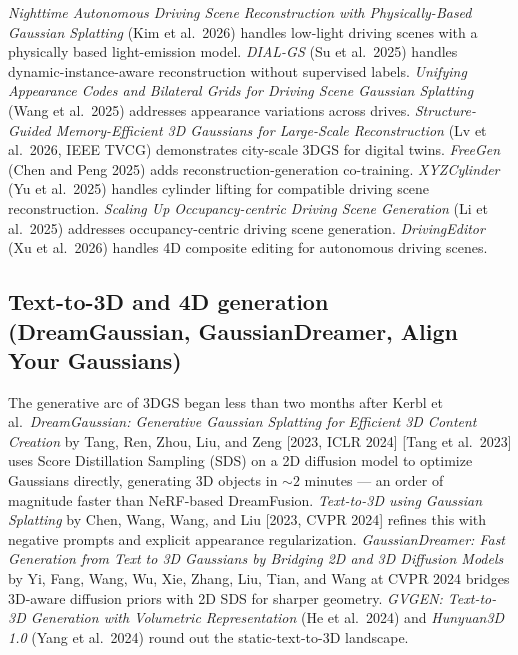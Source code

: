 \documentclass{article}
\begin{document}
\emph{Nighttime Autonomous Driving Scene Reconstruction with Physically-Based Gaussian Splatting} (Kim et al.~2026) handles low-light driving scenes with a physically based light-emission model. \emph{DIAL-GS} (Su et al.~2025) handles dynamic-instance-aware reconstruction without supervised labels. \emph{Unifying Appearance Codes and Bilateral Grids for Driving Scene Gaussian Splatting} (Wang et al.~2025) addresses appearance variations across drives. \emph{Structure-Guided Memory-Efficient 3D Gaussians for Large-Scale Reconstruction} (Lv et al.~2026, IEEE TVCG) demonstrates city-scale 3DGS for digital twins. \emph{FreeGen} (Chen and Peng 2025) adds reconstruction-generation co-training. \emph{XYZCylinder} (Yu et al.~2025) handles cylinder lifting for compatible driving scene reconstruction. \emph{Scaling Up Occupancy-centric Driving Scene Generation} (Li et al.~2025) addresses occupancy-centric driving scene generation. \emph{DrivingEditor} (Xu et al.~2026) handles 4D composite editing for autonomous driving scenes.

\subsection{Text-to-3D and 4D generation (DreamGaussian, GaussianDreamer, Align Your Gaussians)}\label{text-to-3d-and-4d-generation-dreamgaussian-gaussiandreamer-align-your-gaussians}

The generative arc of 3DGS began less than two months after Kerbl et al.~\emph{DreamGaussian: Generative Gaussian Splatting for Efficient 3D Content Creation} by Tang, Ren, Zhou, Liu, and Zeng {[}2023, ICLR 2024{]} {[}Tang et al.~2023{]} uses Score Distillation Sampling (SDS) on a 2D diffusion model to optimize Gaussians directly, generating 3D objects in \(\sim 2\) minutes --- an order of magnitude faster than NeRF-based DreamFusion. \emph{Text-to-3D using Gaussian Splatting} by Chen, Wang, Wang, and Liu {[}2023, CVPR 2024{]} \cite{chen2023neusgneuralimplici} refines this with negative prompts and explicit appearance regularization. \emph{GaussianDreamer: Fast Generation from Text to 3D Gaussians by Bridging 2D and 3D Diffusion Models} by Yi, Fang, Wang, Wu, Xie, Zhang, Liu, Tian, and Wang at CVPR 2024 \cite{yi2024gaussiandreamerfas} bridges 3D-aware diffusion priors with 2D SDS for sharper geometry. \emph{GVGEN: Text-to-3D Generation with Volumetric Representation} (He et al.~2024) and \emph{Hunyuan3D 1.0} (Yang et al.~2024) round out the static-text-to-3D landscape.
\end{document}
